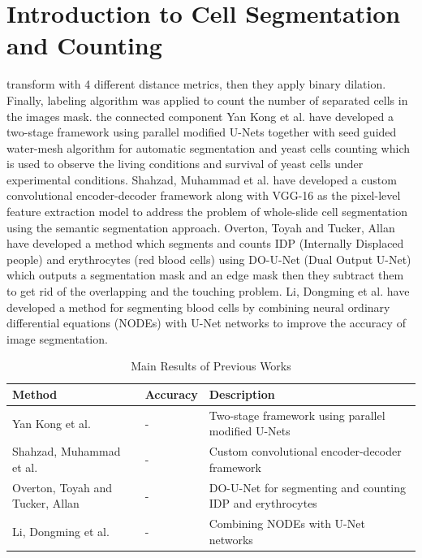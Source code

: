 \documentclass[conference]{IEEEtran}
\begin{document}
\section{Introduction to Cell Segmentation and Counting}
transform with 4 different distance metrics, then they apply binary dilation. Finally, labeling algorithm was applied to count the number of separated cells in the images mask.
the connected component
Yan Kong et al. \cite{ref10} have developed a two-stage framework using parallel modified U-Nets together with seed guided water-mesh algorithm for automatic segmentation and yeast cells counting which is used to observe the living conditions and survival of yeast cells under experimental conditions.
Shahzad, Muhammad et al. \cite{ref11} have developed a custom convolutional encoder-decoder framework along with VGG-16 as the pixel-level feature extraction model to address the problem of whole-slide cell segmentation using the semantic segmentation approach. Overton, Toyah and Tucker, Allan \cite{ref12} have developed a method which segments and counts IDP (Internally Displaced people) and erythrocytes (red blood cells) using DO-U-Net (Dual Output U-Net) which outputs a segmentation mask and an edge mask then they subtract them to get rid of the overlapping and the touching problem. Li, Dongming et al. \cite{ref13} have developed a method for segmenting blood cells by combining neural ordinary differential equations (NODEs) with U-Net networks to improve the accuracy of image segmentation.
\begin{table}[htbp]
\centering
\caption{Main Results of Previous Works}
\label{tab:mainresults}
\begin{tabular}{lll}
\hline
Method & Accuracy & Description \\
\hline
Yan Kong et al. & - & Two-stage framework using parallel modified U-Nets \\
Shahzad, Muhammad et al. & - & Custom convolutional encoder-decoder framework \\
Overton, Toyah and Tucker, Allan & - & DO-U-Net for segmenting and counting IDP and erythrocytes \\
Li, Dongming et al. & - & Combining NODEs with U-Net networks \\
\hline
\end{tabular}
\end{table}
\end{document}
